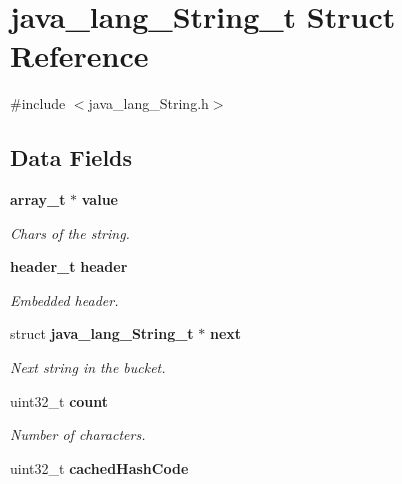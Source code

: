 \section{java\_\-lang\_\-String\_\-t Struct Reference}
\label{structjava__lang___string__t}


{\ttfamily \#include $<$java\_\-lang\_\-String.h$>$}

\subsection*{Data Fields}
\begin{DoxyCompactItemize}
\item 
{\bf array\_\-t} $\ast$ {\bf value}\label{structjava__lang___string__t_ac72ca9b82fd67d2de30f5b6f601fe140}

\begin{DoxyCompactList}\small\item\em Chars of the string. \item\end{DoxyCompactList}\item 
{\bf header\_\-t} {\bf header}\label{structjava__lang___string__t_ab0e2de0d3b1114c3f47a3b079bda724a}

\begin{DoxyCompactList}\small\item\em Embedded header. \item\end{DoxyCompactList}\item 
struct {\bf java\_\-lang\_\-String\_\-t} $\ast$ {\bf next}\label{structjava__lang___string__t_a4d801acf464b9779fc69c5f4fc533981}

\begin{DoxyCompactList}\small\item\em Next string in the bucket. \item\end{DoxyCompactList}\item 
uint32\_\-t {\bf count}\label{structjava__lang___string__t_a246c1dff3077fc001f57f92ae1237753}

\begin{DoxyCompactList}\small\item\em Number of characters. \item\end{DoxyCompactList}\item 
uint32\_\-t {\bf cachedHashCode}\label{structjava__lang___string__t_ab8ee0c152b97b86b95cc61b5c43bc51d}


\end{DoxyCompactItemize}
